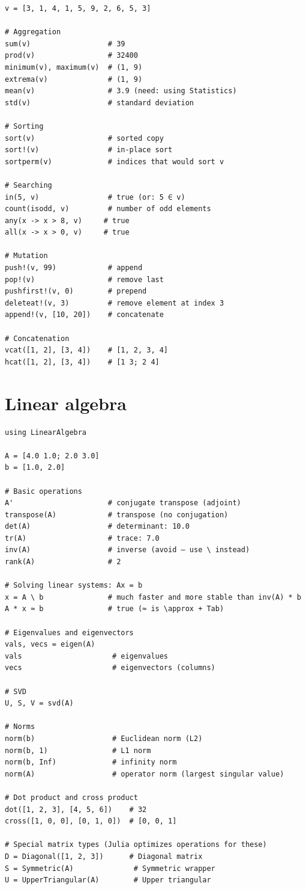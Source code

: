 \begin{verbatim}
v = [3, 1, 4, 1, 5, 9, 2, 6, 5, 3]

# Aggregation
sum(v)                  # 39
prod(v)                 # 32400
minimum(v), maximum(v)  # (1, 9)
extrema(v)              # (1, 9)
mean(v)                 # 3.9 (need: using Statistics)
std(v)                  # standard deviation

# Sorting
sort(v)                 # sorted copy
sort!(v)                # in-place sort
sortperm(v)             # indices that would sort v

# Searching
in(5, v)                # true (or: 5 ∈ v)
count(isodd, v)         # number of odd elements
any(x -> x > 8, v)     # true
all(x -> x > 0, v)     # true

# Mutation
push!(v, 99)            # append
pop!(v)                 # remove last
pushfirst!(v, 0)        # prepend
deleteat!(v, 3)         # remove element at index 3
append!(v, [10, 20])    # concatenate

# Concatenation
vcat([1, 2], [3, 4])    # [1, 2, 3, 4]
hcat([1, 2], [3, 4])    # [1 3; 2 4]
\end{verbatim}

\section{Linear algebra}

\begin{verbatim}
using LinearAlgebra

A = [4.0 1.0; 2.0 3.0]
b = [1.0, 2.0]

# Basic operations
A'                      # conjugate transpose (adjoint)
transpose(A)            # transpose (no conjugation)
det(A)                  # determinant: 10.0
tr(A)                   # trace: 7.0
inv(A)                  # inverse (avoid — use \ instead)
rank(A)                 # 2

# Solving linear systems: Ax = b
x = A \ b               # much faster and more stable than inv(A) * b
A * x ≈ b               # true (≈ is \approx + Tab)

# Eigenvalues and eigenvectors
vals, vecs = eigen(A)
vals                     # eigenvalues
vecs                     # eigenvectors (columns)

# SVD
U, S, V = svd(A)

# Norms
norm(b)                  # Euclidean norm (L2)
norm(b, 1)               # L1 norm
norm(b, Inf)             # infinity norm
norm(A)                  # operator norm (largest singular value)

# Dot product and cross product
dot([1, 2, 3], [4, 5, 6])    # 32
cross([1, 0, 0], [0, 1, 0])  # [0, 0, 1]

# Special matrix types (Julia optimizes operations for these)
D = Diagonal([1, 2, 3])      # Diagonal matrix
S = Symmetric(A)              # Symmetric wrapper
U = UpperTriangular(A)        # Upper triangular
\end{verbatim}

